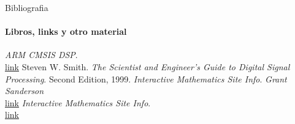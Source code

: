 \begin{frame}{Bibliografia}
   \framesubtitle{Libros, links y otro material}
   \begin{thebibliography}{9}
         \emph{ARM CMSIS DSP}. \\
         \href {https://arm-software.github.io/CMSIS_5/DSP/html/index.html}{link}
         Steven W. Smith.
         \emph{The Scientist and Engineer's Guide to Digital Signal Processing}.
         Second Edition, 1999.
         \emph{Interactive Mathematics Site Info}.
         \emph{Grant Sanderson} \\
         \href{ https://youtu.be/spUNpyF58BY}{link}
            \emph{Interactive Mathematics Site Info}. \\
            \href {https://www.intmath.com/fourier-series/fourier-intro.php}{link}
   \end{thebibliography}
\end{frame}

